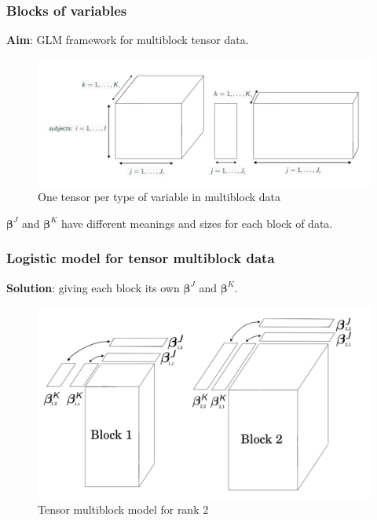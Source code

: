 \documentclass{beamer}
\begin{document}
\begin{frame}
 \frametitle{Blocks of variables}
 \textbf{Aim}: GLM framework for multiblock tensor data.\\[10 pt]

 \begin{figure}
    \centering
    \includegraphics[scale = 0.3]{images/blocks_faux.png}
    \caption{One tensor per type of variable in multiblock data}
\end{figure}

$\bm{\beta}^J$ and $\bm{\beta}^K$ have different meanings and sizes for each block of data.

\end{frame}


\begin{frame}
    \frametitle{Logistic model for tensor multiblock data}
    \vspace{10 pt}
    \textbf{Solution}: giving each block its own $\bm{\beta}^J$ and $\bm{\beta}^K$.\\[15 pt]
    \begin{figure}
        \centering
        \includegraphics[scale = 0.28]{images/beta_blocks.png}
        \caption{Tensor multiblock model for rank 2}
    \end{figure}
\end{frame}
\end{document}
